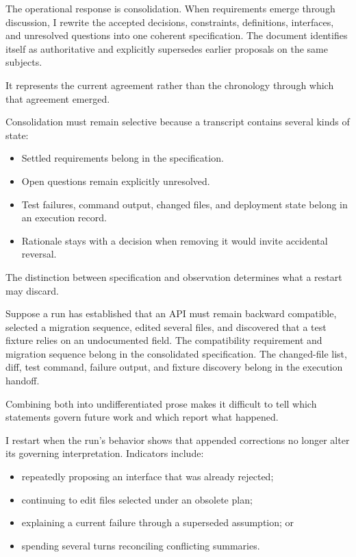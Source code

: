 The operational response is consolidation. When requirements emerge through discussion, I rewrite the accepted decisions, constraints, definitions, interfaces, and unresolved questions into one coherent specification. The document identifies itself as authoritative and explicitly supersedes earlier proposals on the same subjects.

It represents the current agreement rather than the chronology through which that agreement emerged.


Consolidation must remain selective because a transcript contains several kinds of state:

\begin{itemize}
\tightlist
\item
  Settled requirements belong in the specification.
\item
  Open questions remain explicitly unresolved.
\item
  Test failures, command output, changed files, and deployment state belong in an execution record.
\item
  Rationale stays with a decision when removing it would invite accidental reversal.
\end{itemize}

The distinction between specification and observation determines what a restart may discard.

Suppose a run has established that an API must remain backward compatible, selected a migration sequence, edited several files, and discovered that a test fixture relies on an undocumented field. The compatibility requirement and migration sequence belong in the consolidated specification. The changed-file list, diff, test command, failure output, and fixture discovery belong in the execution handoff.

Combining both into undifferentiated prose makes it difficult to tell which statements govern future work and which report what happened.


I restart when the run's behavior shows that appended corrections no longer alter its governing interpretation. Indicators include:

\begin{itemize}
\tightlist
\item
  repeatedly proposing an interface that was already rejected;
\item
  continuing to edit files selected under an obsolete plan;
\item
  explaining a current failure through a superseded assumption; or
\item
  spending several turns reconciling conflicting summaries.
\end{itemize}


